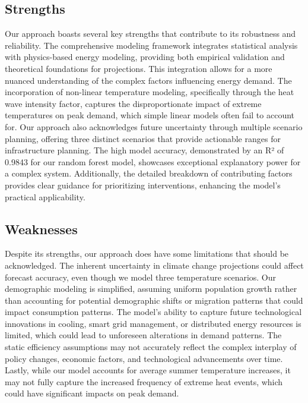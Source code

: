 \documentclass{article}
\begin{document}
\subsection*{Strengths}
Our approach boasts several key strengths that contribute to its robustness and reliability. The comprehensive modeling framework integrates statistical analysis with physics-based energy modeling, providing both empirical validation and theoretical foundations for projections. This integration allows for a more nuanced understanding of the complex factors influencing energy demand. The incorporation of non-linear temperature modeling, specifically through the heat wave intensity factor, captures the disproportionate impact of extreme temperatures on peak demand, which simple linear models often fail to account for. Our approach also acknowledges future uncertainty through multiple scenario planning, offering three distinct scenarios that provide actionable ranges for infrastructure planning. The high model accuracy, demonstrated by an R² of 0.9843 for our random forest model, showcases exceptional explanatory power for a complex system. Additionally, the detailed breakdown of contributing factors provides clear guidance for prioritizing interventions, enhancing the model's practical applicability.

\subsection*{Weaknesses}
 Despite its strengths, our approach does have some limitations that should be acknowledged. The inherent uncertainty in climate change projections could affect forecast accuracy, even though we model three temperature scenarios. Our demographic modeling is simplified, assuming uniform population growth rather than accounting for potential demographic shifts or migration patterns that could impact consumption patterns. The model's ability to capture future technological innovations in cooling, smart grid management, or distributed energy resources is limited, which could lead to unforeseen alterations in demand patterns. The static efficiency assumptions may not accurately reflect the complex interplay of policy changes, economic factors, and technological advancements over time. Lastly, while our model accounts for average summer temperature increases, it may not fully capture the increased frequency of extreme heat events, which could have significant impacts on peak demand.
\end{document}
